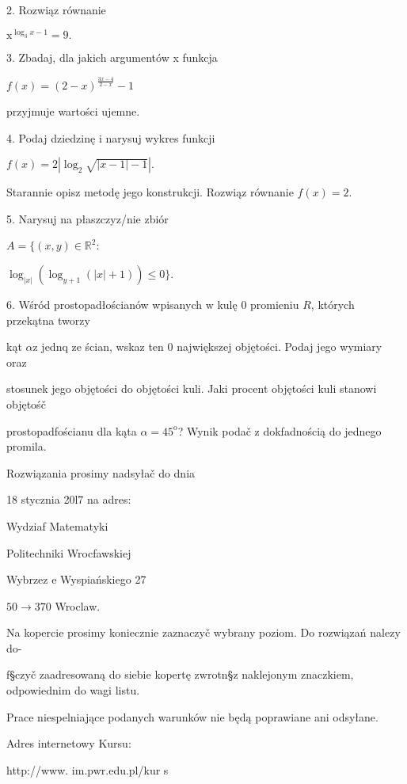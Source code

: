 \documentclass[a4paper,12pt]{article}
\begin{document}
2. Rozwiąz równanie

$\mathrm{x}^{\log_{3}x-1}=9.$

3. Zbadaj, dla jakich argumentów x funkcja

$f(x)=(2-x)^{\frac{3x-4}{2-x}}-1$

przyjmuje wartości ujemne.

4. Podaj dziedzinę $\mathrm{i}$ narysuj wykres funkcji

$f(x)=2|\log_{2}\sqrt{|x-1|-1}|.$

Starannie opisz metodę jego konstrukcji. Rozwiąz równanie $f(x)=2.$

5. Narysuj na płaszczyz/nie zbiór

$A=\{(x,y)\in \mathbb{R}^{2}$:

$\log_{|x|}(\log_{y+1}(|x|+1)) \leq 0\}.$

6. Wśród prostopadłościanów wpisanych $\mathrm{w}$ kulę $0$ promieniu $R$, których przekątna tworzy

kąt $\alpha \mathrm{z}$ jednq ze ścian, wskaz ten $0$ największej objętości. Podaj jego wymiary oraz

stosunek jego objętości do objętości kuli. Jaki procent objętości kuli stanowi objętośč

prostopadfościanu dla kąta $\alpha=45^{\mathrm{o}}$? Wynik podač $\mathrm{z}$ dokfadnością do jednego promila.

Rozwiązania prosimy nadsyłač do dnia

18 stycznia 20l7 na adres:

Wydziaf Matematyki

Politechniki Wrocfawskiej

Wybrzez $\mathrm{e}$ Wyspiańskiego 27

$50\rightarrow 370$ Wroclaw.

Na kopercie prosimy koniecznie zaznaczyč wybrany poziom. Do rozwiązań nalez$\mathrm{y}$ do-

f\S czyč zaadresowaną do siebie kopertę zwrotn\S z naklejonym znaczkiem, odpowiednim do wagi listu.

Prace niespelniające podanych warunków nie będą poprawiane ani odsyłane.

Adres internetowy Kursu:

http://www. im.pwr.edu.pl/kur s
\end{document}
